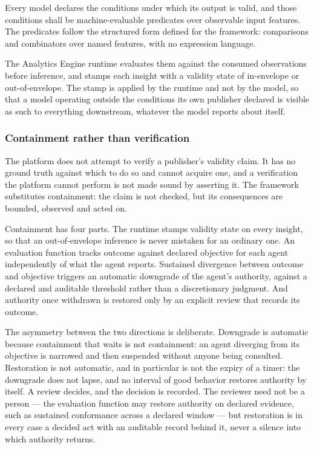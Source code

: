 Every model declares the conditions under which its output is valid, and
those conditions shall be machine-evaluable predicates over observable
input features. The predicates follow the structured form defined for
the framework: comparisons and combinators over named features, with no
expression language.

The Analytics Engine runtime evaluates them against the consumed
observations before inference, and stamps each insight with a validity
state of in-envelope or out-of-envelope. The stamp is applied by the
runtime and not by the model, so that a model operating outside the
conditions its own publisher declared is visible as such to everything
downstream, whatever the model reports about itself.

\hypertarget{containment-rather-than-verification}{%
\subsubsection{Containment rather than verification}\label{containment-rather-than-verification}}

The platform does not attempt to verify a publisher's validity claim. It
has no ground truth against which to do so and cannot acquire one, and a
verification the platform cannot perform is not made sound by asserting
it. The framework substitutes containment: the claim is not checked, but
its consequences are bounded, observed and acted on.

Containment has four parts. The runtime stamps validity state on every
insight, so that an out-of-envelope inference is never mistaken for an
ordinary one. An evaluation function tracks outcome against declared
objective for each agent independently of what the agent reports.
Sustained divergence between outcome and objective triggers an automatic
downgrade of the agent's authority, against a declared and auditable
threshold rather than a discretionary judgment. And authority once
withdrawn is restored only by an explicit review that records its
outcome.

The asymmetry between the two directions is deliberate. Downgrade is
automatic because containment that waits is not containment: an agent
diverging from its objective is narrowed and then suspended without
anyone being consulted. Restoration is not automatic, and in particular
is not the expiry of a timer: the downgrade does not lapse, and no
interval of good behavior restores authority by itself. A review
decides, and the decision is recorded. The reviewer need not be a person
--- the evaluation function may restore authority on declared evidence,
such as sustained conformance across a declared window --- but
restoration is in every case a decided act with an auditable record
behind it, never a silence into which authority returns.

